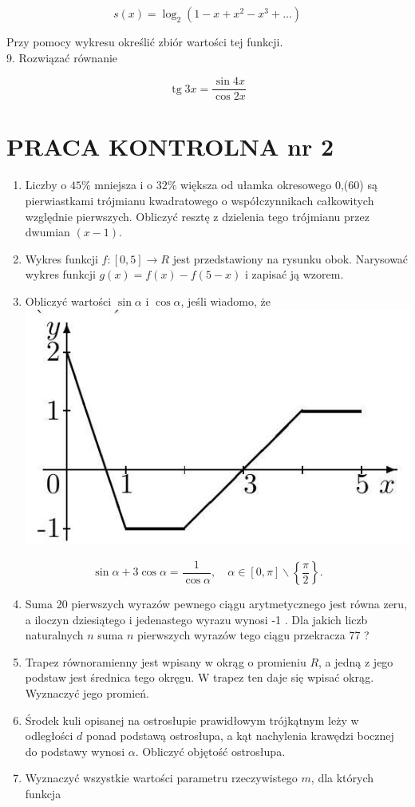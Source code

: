 \documentclass[10pt]{article}
\begin{document}
$$
s(x)=\log _{2}\left(1-x+x^{2}-x^{3}+\ldots\right)
$$

Przy pomocy wykresu określić zbiór wartości tej funkcji.\\
9. Rozwiązać równanie

$$
\operatorname{tg} 3 x=\frac{\sin 4 x}{\cos 2 x}
$$

\section*{PRACA KONTROLNA nr 2}
\begin{enumerate}
  \item Liczby o $45 \%$ mniejsza i o $32 \%$ większa od ułamka okresowego 0,(60) są pierwiastkami trójmianu kwadratowego o współczynnikach całkowitych względnie pierwszych. Obliczyć resztę z dzielenia tego trójmianu przez dwumian $(x-1)$.
  \item Wykres funkcji $f:[0,5] \rightarrow R$ jest przedstawiony na rysunku obok. Narysować wykres funkcji $g(x)=f(x)-f(5-x)$ i zapisać ją wzorem.
  \item Obliczyć wartości $\sin \alpha$ i $\cos \alpha$, jeśli wiadomo, że\\
\includegraphics[max width=\textwidth, center]{2024_11_16_8518088a6e381b1443b2g-2}
\end{enumerate}

$$
\sin \alpha+3 \cos \alpha=\frac{1}{\cos \alpha}, \quad \alpha \in[0, \pi] \backslash\left\{\frac{\pi}{2}\right\} .
$$

\begin{enumerate}
  \setcounter{enumi}{3}
  \item Suma 20 pierwszych wyrazów pewnego ciągu arytmetycznego jest równa zeru, a iloczyn dziesiątego i jedenastego wyrazu wynosi -1 . Dla jakich liczb naturalnych $n$ suma $n$ pierwszych wyrazów tego ciągu przekracza 77 ?
  \item Trapez równoramienny jest wpisany w okrąg o promieniu $R$, a jedną z jego podstaw jest średnica tego okręgu. W trapez ten daje się wpisać okrąg. Wyznaczyć jego promień.
  \item Środek kuli opisanej na ostrosłupie prawidłowym trójkątnym leży w odległości $d$ ponad podstawą ostrosłupa, a kąt nachylenia krawędzi bocznej do podstawy wynosi $\alpha$. Obliczyć objętość ostrosłupa.
  \item Wyznaczyć wszystkie wartości parametru rzeczywistego $m$, dla których funkcja
\end{enumerate}
\end{document}
